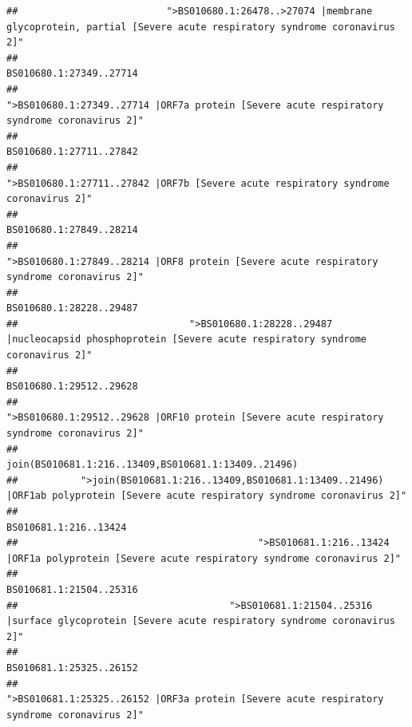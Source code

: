 \documentclass[
]{article}
\begin{document}
\begin{verbatim}
##                          ">BS010680.1:26478..>27074 |membrane glycoprotein, partial [Severe acute respiratory syndrome coronavirus 2]" 
##                                                                                                                BS010680.1:27349..27714 
##                                            ">BS010680.1:27349..27714 |ORF7a protein [Severe acute respiratory syndrome coronavirus 2]" 
##                                                                                                                BS010680.1:27711..27842 
##                                                    ">BS010680.1:27711..27842 |ORF7b [Severe acute respiratory syndrome coronavirus 2]" 
##                                                                                                                BS010680.1:27849..28214 
##                                             ">BS010680.1:27849..28214 |ORF8 protein [Severe acute respiratory syndrome coronavirus 2]" 
##                                                                                                                BS010680.1:28228..29487 
##                              ">BS010680.1:28228..29487 |nucleocapsid phosphoprotein [Severe acute respiratory syndrome coronavirus 2]" 
##                                                                                                                BS010680.1:29512..29628 
##                                            ">BS010680.1:29512..29628 |ORF10 protein [Severe acute respiratory syndrome coronavirus 2]" 
##                                                                                    join(BS010681.1:216..13409,BS010681.1:13409..21496) 
##           ">join(BS010681.1:216..13409,BS010681.1:13409..21496) |ORF1ab polyprotein [Severe acute respiratory syndrome coronavirus 2]" 
##                                                                                                                  BS010681.1:216..13424 
##                                          ">BS010681.1:216..13424 |ORF1a polyprotein [Severe acute respiratory syndrome coronavirus 2]" 
##                                                                                                                BS010681.1:21504..25316 
##                                     ">BS010681.1:21504..25316 |surface glycoprotein [Severe acute respiratory syndrome coronavirus 2]" 
##                                                                                                                BS010681.1:25325..26152 
##                                            ">BS010681.1:25325..26152 |ORF3a protein [Severe acute respiratory syndrome coronavirus 2]" 

\end{verbatim}
\end{document}
